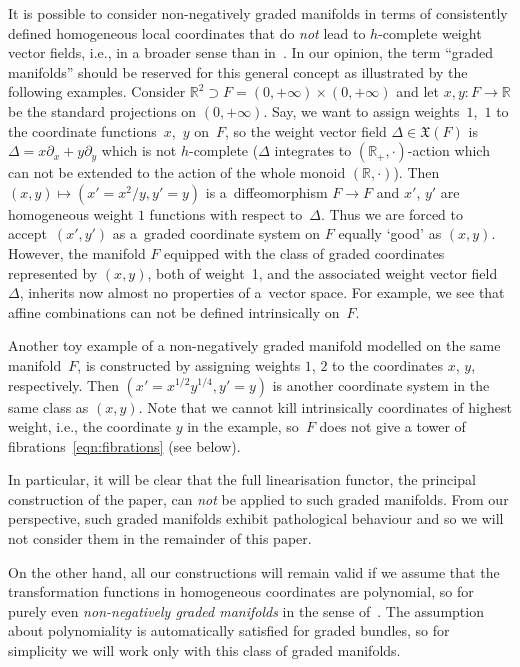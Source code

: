 \documentclass[pdftex]{sigma}
\newcommand{\ra}{\rightarrow}
\newcommand{\R}{{\mathbb R}}
\newcommand{\pa}{\partial}
\numberwithin{equation}{section}
\begin{document}
\begin{Remark}
It is possible to consider non-negatively graded manifolds in terms of consistently def\/ined homogeneous local coordinates that do \emph{not} lead to $h$-complete weight vector f\/ields, i.e., in a broader sense than in~\cite{Voronov:2001qf}. In our opinion, the term ``graded manifolds'' should be reserved for this general concept as illustrated by the following examples. Consider $\R^2\supset F = (0, +\infty)\times (0, +\infty)$ and let $x, y\colon  F\rightarrow \R$ be the standard projections on $(0, +\infty)$. Say, we want to assign weights~$1$,~$1$ to the coordinate functions~$x$,~$y$ on~$F$, so the weight vector f\/ield $\Delta \in \mathfrak{X}(F)$ is $\Delta= x \pa_x + y \pa_y$ which is not $h$-complete ($\Delta$ integrates to $(\R_+, \cdot)$-action which can not be extended to the action of the whole monoid $(\R, \cdot)$). Then $(x, y)\mapsto (x' = x^2/y, y'=y)$ is a~dif\/feomorphism $F\ra F$ and $x'$, $y'$ are homogeneous weight $1$ functions with respect to~$\Delta$. Thus we are forced to accept~$(x', y')$ as a~graded coordinate system on $F$ equally `good' as $(x, y)$. However, the manifold $F$ equipped with the class of graded coordinates represented by $(x, y)$, both of weight~1, and the associated weight vector f\/ield~$\Delta$, inherits now almost no properties of a~vector space. For example, we see that af\/f\/ine combinations can not be def\/ined intrinsically on~$F$.

Another toy example of a non-negatively graded manifold modelled on the same mani\-fold~$F$, is constructed by assigning weights $1$, $2$ to the coordinates $x$, $y$, respectively. Then $(x'=x^{1/2} y^{1/4}, y'=y)$ is another coordinate system in the same class as $(x, y)$. Note that we cannot kill intrinsically coordinates of highest weight, i.e., the coordinate $y$ in the example, so~$F$ does not give a tower of f\/ibrations~\eqref{eqn:fibrations} (see below).

In particular, it will be clear that the full linearisation functor, the principal construction of the paper, can \emph{not} be applied to such graded manifolds. From our perspective, such graded manifolds exhibit pathological behaviour and so we will not consider them in the remainder of this paper.

On the other hand, all our constructions will remain valid if we assume that the transformation functions in homogeneous coordinates are polynomial, so for purely even \emph{non-negatively graded manifolds} in the sense of~\cite{Voronov:2001qf}. The assumption about polynomiality is automatically sa\-tis\-f\/ied for graded bundles, so for simplicity we will work only with this class of graded manifolds.
\end{Remark}
\end{document}
